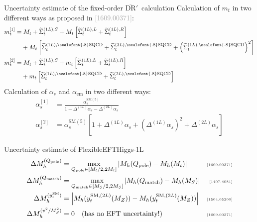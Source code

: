 \documentclass[hyperref={pdfpagelabels=false},ngerman]{beamer}
\newcommand{\MS}{\ensuremath{M_S}}
\newcommand{\mycite}[1]{\ensuremath{\text{\textcolor{darkgray}{\tiny [#1]}}}}
\newcommand{\bigcite}[1]{\textcolor{darkgray}{[#1]}}
\newcommand{\DRbarp}{\ensuremath{\overline{\text{DR}}'}}
\newcommand{\SM}{\ensuremath{\text{SM}}}
\newcommand{\as}{\alpha_s}
\newcommand{\aem}{\alpha_\text{em}}
\newcommand{\SQCD}{\ensuremath{\scalefont{.8}\text{SQCD}}}
\newcommand{\Qpole}{\ensuremath{Q_\text{pole}}}
\newcommand{\Qmatch}{\ensuremath{Q_\text{match}}}
\newcommand{\DMhQpole}{\ensuremath{\Delta M_h^{(\Qpole)}}}
\newcommand{\DMhQmatch}{\ensuremath{\Delta M_h^{(\Qmatch)}}}
\newcommand{\DMhHSSUSYytSM}{\ensuremath{\Delta M_h^{(y_t^\SM)}}}
\newcommand{\DMhEFT}{\ensuremath{\Delta M_h^{(v^2/\MS^2)}}}
\begin{document}

\begin{frame}[noframenumbering]{Uncertainty estimate of the fixed-order \DRbarp\ calculation}
  Calculation of $m_t$ in two different ways as proposed in
  \bigcite{1609.00371}:
  \begin{align*}
    m_t^{[1]} &=
                M_t + \widetilde{\Sigma}_t^{(1L),S} +
                M_t \left[
                \widetilde{\Sigma}_t^{(1L),L} +
                \widetilde{\Sigma}_t^{(1L),R}
                \right] \\
              &\phantom{={}} + M_t
                \left[\widetilde{\Sigma}_t^{(1L),\SQCD}
                + \widetilde{\Sigma}_t^{(2L),\SQCD}
                + \left(\widetilde{\Sigma}_t^{(1L),\SQCD}\right)^2
                \right]\\
    m_t^{[2]} &=
                M_t + \widetilde{\Sigma}_t^{(1L),S} +
                m_t \left[
                \widetilde{\Sigma}_t^{(1L),L} +
                \widetilde{\Sigma}_t^{(1L),R}
                \right] \nonumber \\
              &\phantom{={}} +
                m_t
                \left[\widetilde{\Sigma}_t^{(1L),\SQCD} +
                \widetilde{\Sigma}_t^{(2L),\SQCD}
                \right]
  \end{align*}
  Calculation of $\as$ and $\aem$ in two different ways:
  \begin{align*}
    \as^{[1]}  &= \frac{\as^{\SM(5)}}{1 - \Delta^{(1L)}\as - \Delta^{(2L)}\as}\\
    \as^{[2]}  &= \as^{\SM(5)} \left[1 + \Delta^{(1L)}\as + (\Delta^{(1L)}\as)^2 + \Delta^{(2L)}\as\right]
  \end{align*}
\end{frame}


\begin{frame}[noframenumbering]{Uncertainty estimate of FlexibleEFTHiggs-1L}
  \begin{align*}
    \DMhQpole &= \max_{\Qpole\in[M_t/2,2M_t]}\left|M_h(\Qpole) - M_h(M_t)\right| & \text{\mycite{1609.00371}} \\
    \DMhQmatch &= \max_{\Qmatch\in[\MS/2,2\MS]}\left|M_h(\Qmatch) - M_h(\MS)\right| & \text{\mycite{1407.4081}} \\
    \DMhHSSUSYytSM &= \left| M_h(y_t^{\SM,(2L)}(M_Z)) - M_h(y_t^{\SM,(3L)}(M_Z)) \right| & \text{\mycite{1504.05200}} \\
    \DMhEFT &= 0 \quad \text{(has no EFT uncertainty!)} & \text{\mycite{1609.00371}}
  \end{align*}
\end{frame}
\end{document}

